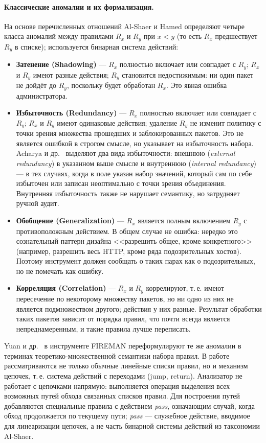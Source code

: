 \paragraph{Классические аномалии и их формализация.} На основе перечисленных отношений Al-Shaer и Hamed определяют четыре класса аномалий между правилами $R_x$ и $R_y$ при $x < y$ (то есть $R_x$ предшествует $R_y$ в списке); используется бинарная система действий:
\begin{itemize}
    \item \textbf{Затенение (Shadowing)} --- $R_x$ полностью включает или совпадает с $R_y$; $R_x$ и $R_y$ имеют разные действия; $R_y$ становится недостижимым: ни один пакет не дойдёт до $R_y$, поскольку будет обработан $R_x$. Это явная ошибка администратора.
    \item \textbf{Избыточность (Redundancy)} --- $R_x$ полностью включает или совпадает с $R_y$; $R_x$ и $R_y$ имеют одинаковые действия; удаление $R_y$ не изменит политику с точки зрения множества прошедших и заблокированных пакетов. Это не является ошибкой в строгом смысле, но указывает на избыточность набора. Acharya и др.~\cite{acharya2006traffic} выделяют два вида избыточности: внешнюю (\emph{external redundancy}) в указанном выше смысле и внутреннюю (\emph{internal redundancy}) --- в тех случаях, когда в поле указан набор значений, который сам по себе избыточен или записан неоптимально с точки зрения объединения. Внутренняя избыточность также не нарушает семантику, но затрудняет ручной аудит.
    \item \textbf{Обобщение (Generalization)} --- $R_x$ является полным включением $R_y$ с противоположным действием. В общем случае не ошибка: нередко это сознательный паттерн дизайна <<разрешить общее, кроме конкретного>> (например, разрешить весь HTTP, кроме ряда подозрительных хостов). Поэтому инструмент должен сообщать о таких парах как о подозрительных, но не помечать как ошибку.
    \item \textbf{Корреляция (Correlation)} --- $R_x$ и $R_y$ коррелируют, т.\,е. имеют пересечение по некоторому множеству пакетов, но ни одно из них не является подмножеством другого; действия у них разные. Результат обработки таких пакетов зависит от порядка правил, что почти всегда является непреднамеренным, и такие правила лучше переписать.
\end{itemize}

Yuan и др.~\cite{yuan2006fireman} в инструменте FIREMAN переформулируют те же аномалии в терминах теоретико-множественной семантики набора правил. В работе рассматриваются не только обычные линейные списки правил, но и механизм цепочек, т.\,е. система действий с переходами (jump, return). Анализатор не работает с цепочками напрямую: выполняется операция выделения всех возможных путей обхода связанных списков правил. Для построения путей добавляются специальные правила с действием \emph{pass}, означающим случай, когда обход продолжается по текущему пути; \emph{pass} --- служебное действие, вводимое для линеаризации цепочек, а не часть бинарной системы действий из таксономии Al-Shaer.

